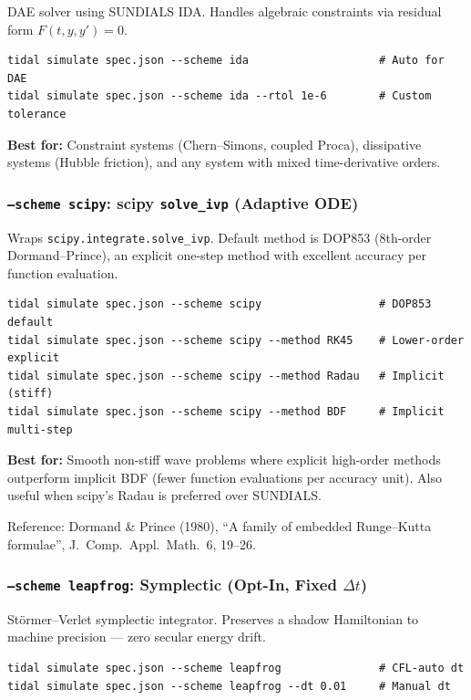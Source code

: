 DAE solver using SUNDIALS IDA. Handles algebraic constraints via residual
form $F(t, y, y') = 0$.

\begin{lstlisting}[style=bash]
tidal simulate spec.json --scheme ida                    # Auto for DAE
tidal simulate spec.json --scheme ida --rtol 1e-6        # Custom tolerance
\end{lstlisting}

\textbf{Best for:} Constraint systems (Chern--Simons, coupled Proca), dissipative
systems (Hubble friction), and any system with mixed time-derivative orders.

\subsubsection{\texttt{--scheme scipy}: scipy \texttt{solve\_ivp} (Adaptive ODE)}
\label{sec:scheme-scipy}

Wraps \texttt{scipy.integrate.solve\_ivp}. Default method is DOP853 (8th-order
Dormand--Prince), an explicit one-step method with excellent accuracy per
function evaluation.

\begin{lstlisting}[style=bash]
tidal simulate spec.json --scheme scipy                  # DOP853 default
tidal simulate spec.json --scheme scipy --method RK45    # Lower-order explicit
tidal simulate spec.json --scheme scipy --method Radau   # Implicit (stiff)
tidal simulate spec.json --scheme scipy --method BDF     # Implicit multi-step
\end{lstlisting}

\textbf{Best for:} Smooth non-stiff wave problems where explicit high-order
methods outperform implicit BDF (fewer function evaluations per accuracy
unit). Also useful when scipy's Radau is preferred over SUNDIALS.

Reference: Dormand \& Prince (1980), ``A family of embedded Runge--Kutta
formulae'', J.\ Comp.\ Appl.\ Math.\ 6, 19--26.

\subsubsection{\texttt{--scheme leapfrog}: Symplectic (Opt-In, Fixed $\Delta t$)}
\label{sec:scheme-leapfrog}

St\"ormer--Verlet symplectic integrator. Preserves a shadow Hamiltonian to
machine precision --- zero secular energy drift.

\begin{lstlisting}[style=bash]
tidal simulate spec.json --scheme leapfrog               # CFL-auto dt
tidal simulate spec.json --scheme leapfrog --dt 0.01     # Manual dt
\end{lstlisting}

